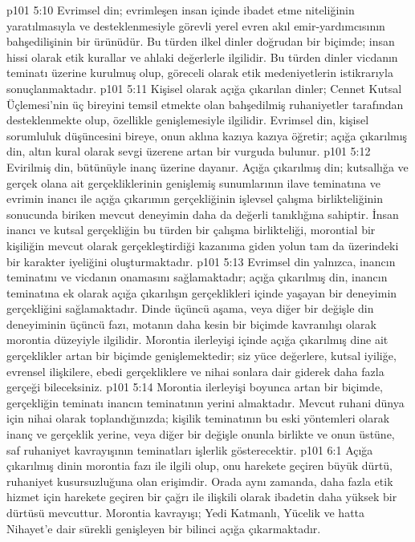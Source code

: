 \vs p101 5:10 Evrimsel din; evrimleşen insan içinde ibadet etme niteliğinin yaratılmasıyla ve desteklenmesiyle görevli yerel evren akıl emir\hyp{}yardımcısının bahşedilişinin bir ürünüdür. Bu türden ilkel dinler doğrudan bir biçimde; insan  hissi olarak etik kurallar ve ahlaki değerlerle ilgilidir. Bu türden dinler vicdanın teminatı üzerine kurulmuş olup, göreceli olarak etik medeniyetlerin istikrarıyla sonuçlanmaktadır.
\vs p101 5:11 Kişisel olarak açığa çıkarılan dinler; Cennet Kutsal Üçlemesi’nin üç bireyini temsil etmekte olan bahşedilmiş ruhaniyetler tarafından desteklenmekte olup, özellikle  genişlemesiyle ilgilidir. Evrimsel din, kişisel sorumluluk düşüncesini bireye, onun aklına kazıya kazıya öğretir; açığa çıkarılmış din, altın kural olarak sevgi üzerene artan bir vurguda bulunur.
\vs p101 5:12 Evirilmiş din, bütünüyle inanç üzerine dayanır. Açığa çıkarılmış din; kutsallığa ve gerçek olana ait gerçekliklerinin genişlemiş sunumlarının ilave teminatına ve evrimin inancı ile açığa çıkarımın gerçekliğinin işlevsel çalışma birlikteliğinin sonucunda biriken mevcut deneyimin daha da değerli tanıklığına sahiptir. İnsan inancı ve kutsal gerçekliğin bu türden bir çalışma birlikteliği, morontial bir kişiliğin mevcut olarak gerçekleştirdiği kazanıma giden yolun tam da üzerindeki bir karakter iyeliğini oluşturmaktadır.
\vs p101 5:13 Evrimsel din yalnızca, inancın teminatını ve vicdanın onamasını sağlamaktadır; açığa çıkarılmış din, inancın teminatına ek olarak açığa çıkarılışın gerçeklikleri içinde yaşayan bir deneyimin gerçekliğini sağlamaktadır. Dinde üçüncü aşama, veya diğer bir değişle din deneyiminin üçüncü fazı, motanın daha kesin bir biçimde kavranılışı olarak morontia düzeyiyle ilgilidir. Morontia ilerleyişi içinde açığa çıkarılmış dine ait gerçeklikler artan bir biçimde genişlemektedir; siz yüce değerlere, kutsal iyiliğe, evrensel ilişkilere, ebedi gerçekliklere ve nihai sonlara dair giderek daha fazla gerçeği bileceksiniz.
\vs p101 5:14 Morontia ilerleyişi boyunca artan bir biçimde, gerçekliğin teminatı inancın teminatının yerini almaktadır. Mevcut ruhani dünya için nihai olarak toplandığınızda; kişilik teminatının bu eski yöntemleri olarak inanç ve gerçeklik yerine, veya diğer bir değişle onunla birlikte ve onun üstüne, saf ruhaniyet kavrayışının teminatları işlerlik gösterecektir.
\vs p101 6:1 Açığa çıkarılmış dinin morontia fazı  ile ilgili olup, onu harekete geçiren büyük dürtü, ruhaniyet kusursuzluğuna olan erişimdir. Orada aynı zamanda, daha fazla etik hizmet için harekete geçiren bir çağrı ile ilişkili olarak ibadetin daha yüksek bir dürtüsü mevcuttur. Morontia kavrayışı; Yedi Katmanlı, Yücelik ve hatta Nihayet’e dair sürekli genişleyen bir bilinci açığa çıkarmaktadır.

